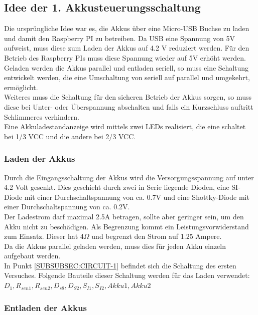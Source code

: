 \documentclass[12pt,a4paper]{article}
\begin{document}
{\subsection{Idee der 1. Akkusteuerungsschaltung}
\label{SUBSEC:AKKUSTEUR1}

Die ursprüngliche Idee war es, die Akkus über eine Micro-USB Buchse zu laden und damit den Raspberry PI zu betreiben. Da USB eine Spannung von 5V aufweist, muss diese zum Laden der Akkus auf 4.2 V reduziert werden. Für den Betrieb des Raspberry PIs muss diese Spannung wieder auf 5V erhöht werden. \\
Geladen werden die Akkus parallel und entladen seriell, so muss eine Schaltung entwickelt werden, die eine Umschaltung von seriell auf parallel und umgekehrt, ermöglicht. \\
Weiteres muss die Schaltung für den sicheren Betrieb der Akkus sorgen, so muss diese bei Unter- oder Überspannung abschalten und falls ein Kurzschluss auftritt Schlimmeres verhindern. \\
Eine Akkuladestandanzeige wird mittels zwei LEDs realisiert, die eine schaltet bei 1/3 VCC und die andere bei 2/3 VCC. 

\subsubsection{Laden der Akkus}
\label{SUBSUBSEC:AKKULOAD1}

Durch die Eingangsschaltung der Akkus wird die Versorgungsspannung auf unter 4.2 Volt gesenkt. Dies geschieht durch zwei in Serie liegende Dioden, eine SI-Diode mit einer Durchschaltspannung von ca. 0.7V und eine Shottky-Diode mit einer Durchschaltspannung von ca. 0.2V. \\
Der Ladestrom darf maximal 2.5A betragen, sollte aber geringer sein, um den Akku nicht zu beschädigen. Als Begrenzung kommt ein Leistungsvorwiderstand zum Einsatz. Dieser hat 4$\Omega$ und begrenzt den Strom auf 1.25 Ampere. \\
Da die Akkus parallel geladen werden, muss dies für jeden Akku einzeln aufgebaut werden. \\
In Punkt \ref{SUBSUBSEC:CIRCUIT-1} befindet sich die Schaltung des ersten Versuches. Folgende Bauteile dieser Schaltung werden für das Laden verwendet:\\
 $D_1,R_{sen1},R_{sen2},D_{s8},D_{S2},S_{I1},S_{I2}, Akku1, Akku2$ \\


\subsubsection{Entladen der Akkus}
\label{SUBSUBSEC:AKKUENTLOAD1}

}
\end{document}
